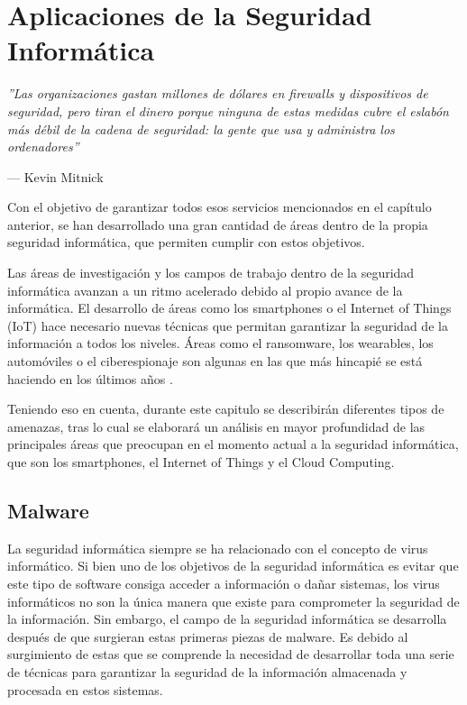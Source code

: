 \chapter[Aplicaciones]{Aplicaciones de la Seguridad Informática}

\epigraph{\textit{''Las organizaciones gastan millones de dólares en firewalls y dispositivos de seguridad, pero tiran el dinero porque ninguna de estas medidas cubre el eslabón más débil de la cadena de seguridad: la gente que usa y administra los ordenadores''}}{--- Kevin Mitnick}

Con el objetivo de garantizar todos esos servicios mencionados en el capítulo anterior, se han desarrollado una gran cantidad de áreas dentro de la propia seguridad informática, que permiten cumplir con estos objetivos.

Las áreas de investigación y los campos de trabajo dentro de la seguridad informática avanzan a un ritmo acelerado debido al propio avance de la informática. El desarrollo de áreas como los smartphones o el Internet of Things (IoT) hace necesario nuevas técnicas que permitan garantizar la seguridad de la información a todos los niveles. Áreas como el ransomware, los wearables, los automóviles o el ciberespionaje son algunas en las que más hincapié se está haciendo en los últimos años \cite{mcafee-predictions}.

Teniendo eso en cuenta, durante este capitulo se describirán diferentes tipos de amenazas, tras lo cual se elaborará un análisis en mayor profundidad de las principales áreas que preocupan en el momento actual a la seguridad informática, que son los smartphones, el Internet of Things y el Cloud Computing.


\section{Malware}

La seguridad informática siempre se ha relacionado con el concepto de virus informático. Si bien uno de los objetivos de la seguridad informática es evitar que este tipo de software consiga acceder a información o dañar sistemas, los virus informáticos no son la única manera que existe para comprometer la seguridad de la información. Sin embargo, el campo de la seguridad informática se desarrolla después de que surgieran estas primeras piezas de malware. Es debido al surgimiento de estas que se comprende la necesidad de desarrollar toda una serie de técnicas para garantizar la seguridad de la información almacenada y procesada en estos sistemas.

